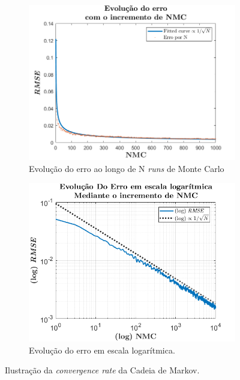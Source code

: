 \begin{figure}[H] 
    \begin{subfigure}[b]{0.5\linewidth}
        \centering
        \includegraphics[width=1\linewidth]{img/P2/P2ii-discard.png}
        \caption{Evolução do erro ao longo de N \textit{runs} de Monte Carlo} 
        \label{fig:P2ii} 
        \vspace{1ex}
    \end{subfigure}%
    \begin{subfigure}[b]{0.5\linewidth}
        \centering
        \includegraphics[width=1\linewidth]{img/P2/P2iilog.png} 
        \caption{Evolução do erro em escala logarítmica.} 
        \label{fig:P2ii-log} 
        \vspace{1ex}
    \end{subfigure} 
    \caption{Ilustração da \textit{convergence rate} da Cadeia de Markov.}
\end{figure}

